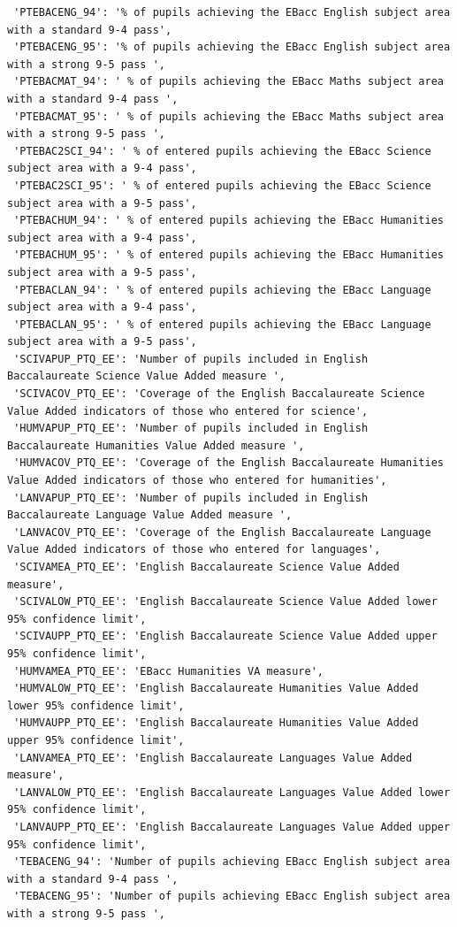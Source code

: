 \documentclass[
  letterpaper,
  DIV=11,
  numbers=noendperiod]{scrartcl}
\begin{document}
\begin{verbatim}
 'PTEBACENG_94': '% of pupils achieving the EBacc English subject area with a standard 9-4 pass',
 'PTEBACENG_95': '% of pupils achieving the EBacc English subject area with a strong 9-5 pass ',
 'PTEBACMAT_94': ' % of pupils achieving the EBacc Maths subject area with a standard 9-4 pass ',
 'PTEBACMAT_95': ' % of pupils achieving the EBacc Maths subject area with a strong 9-5 pass ',
 'PTEBAC2SCI_94': ' % of entered pupils achieving the EBacc Science subject area with a 9-4 pass',
 'PTEBAC2SCI_95': ' % of entered pupils achieving the EBacc Science subject area with a 9-5 pass',
 'PTEBACHUM_94': ' % of entered pupils achieving the EBacc Humanities subject area with a 9-4 pass',
 'PTEBACHUM_95': ' % of entered pupils achieving the EBacc Humanities subject area with a 9-5 pass',
 'PTEBACLAN_94': ' % of entered pupils achieving the EBacc Language subject area with a 9-4 pass',
 'PTEBACLAN_95': ' % of entered pupils achieving the EBacc Language subject area with a 9-5 pass',
 'SCIVAPUP_PTQ_EE': 'Number of pupils included in English Baccalaureate Science Value Added measure ',
 'SCIVACOV_PTQ_EE': 'Coverage of the English Baccalaureate Science Value Added indicators of those who entered for science',
 'HUMVAPUP_PTQ_EE': 'Number of pupils included in English Baccalaureate Humanities Value Added measure ',
 'HUMVACOV_PTQ_EE': 'Coverage of the English Baccalaureate Humanities Value Added indicators of those who entered for humanities',
 'LANVAPUP_PTQ_EE': 'Number of pupils included in English Baccalaureate Language Value Added measure ',
 'LANVACOV_PTQ_EE': 'Coverage of the English Baccalaureate Language Value Added indicators of those who entered for languages',
 'SCIVAMEA_PTQ_EE': 'English Baccalaureate Science Value Added measure',
 'SCIVALOW_PTQ_EE': 'English Baccalaureate Science Value Added lower 95% confidence limit',
 'SCIVAUPP_PTQ_EE': 'English Baccalaureate Science Value Added upper 95% confidence limit',
 'HUMVAMEA_PTQ_EE': 'EBacc Humanities VA measure',
 'HUMVALOW_PTQ_EE': 'English Baccalaureate Humanities Value Added lower 95% confidence limit',
 'HUMVAUPP_PTQ_EE': 'English Baccalaureate Humanities Value Added upper 95% confidence limit',
 'LANVAMEA_PTQ_EE': 'English Baccalaureate Languages Value Added measure',
 'LANVALOW_PTQ_EE': 'English Baccalaureate Languages Value Added lower 95% confidence limit',
 'LANVAUPP_PTQ_EE': 'English Baccalaureate Languages Value Added upper 95% confidence limit',
 'TEBACENG_94': 'Number of pupils achieving EBacc English subject area with a standard 9-4 pass ',
 'TEBACENG_95': 'Number of pupils achieving EBacc English subject area with a strong 9-5 pass ',

\end{verbatim}
\end{document}
